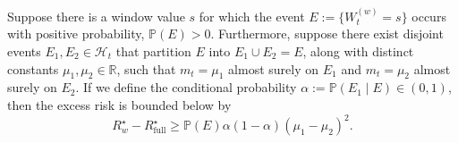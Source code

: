 \documentclass{llmxive}
\providecommand{\Prob}{\mathbb{P}}
\providecommand{\R}{\mathbb{R}}
\providecommand{\cH}{\mathcal{H}}
\begin{document}
\begin{corollary}
\label{cor:atomic_window_lower_bound}
Suppose there is a window value $s$ for which the event $E := \{W_t^{(w)} = s\}$ occurs with positive probability, $\Prob(E)>0$. Furthermore, suppose there exist disjoint events $E_1, E_2 \in \cH_t$ that partition $E$ into $E_1 \cup E_2 = E$, along with distinct constants $\mu_1, \mu_2 \in \R$, such that $m_t = \mu_1$ almost surely on $E_1$ and $m_t = \mu_2$ almost surely on $E_2$. If we define the conditional probability $\alpha := \Prob(E_1 \mid E) \in (0,1)$, then the excess risk is bounded below by
\begin{equation}
R_w^\star - R_{\mathrm{full}}^\star \ge \Prob(E)\alpha(1-\alpha)(\mu_1-\mu_2)^2.
\label{eq:explicit_lower_bound}
\end{equation}
\end{corollary}
\end{document}
